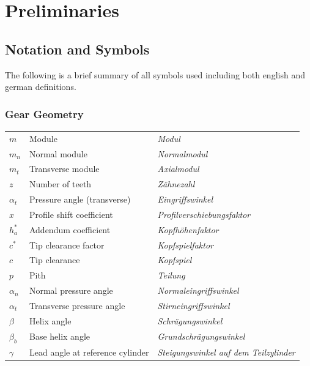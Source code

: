 \section{Preliminaries}
\label{sec:preliminaries}

\subsection{Notation and Symbols}
The following is a brief summary of all symbols used including both english and german definitions.

\subsubsection*{Gear Geometry}
\begin{tabular}{@{}lll@{}}
    $m$         & Module                        & \textit{Modul} \\
    $m_n$       & Normal module                 & \textit{Normalmodul} \\
    $m_t$       & Transverse module             & \textit{Axialmodul} \\
    $z$         & Number of teeth               & \textit{Zähnezahl} \\
    $\alpha_t$  & Pressure angle (transverse)   & \textit{Eingriffswinkel} \\
    $x$         & Profile shift coefficient & \textit{Profilverschiebungsfaktor} \\
    $h_a^*$     & Addendum coefficient          & \textit{Kopfhöhenfaktor} \\
    $c^*$       & Tip clearance factor          & \textit{Kopfspielfaktor} \\
    $c$         & Tip clearance                 & \textit{Kopfspiel} \\
    $p$         & Pith                          & \textit{Teilung} \\
    $\alpha_n$  & Normal pressure angle         & \textit{Normaleingriffswinkel} \\
    $\alpha_t$  & Transverse pressure angle     & \textit{Stirneingriffswinkel} \\
    $\beta$     & Helix angle                   & \textit{Schrägungswinkel} \\
    $\beta_b$   & Base helix angle              & \textit{Grundschrägungswinkel} \\
    $\gamma$    & Lead angle at reference cylinder  & \textit{Steigungswinkel auf dem Teilzylinder} \\
\end{tabular}

